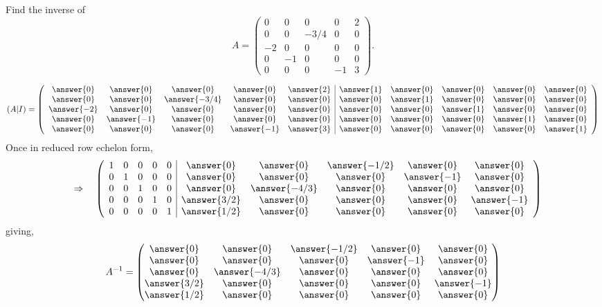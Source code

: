 \documentclass{ximera}
\author{Parisa Fatheddin}
\begin{document}
\begin{exercise}
  Find the inverse of
  \[A = \begin{pmatrix}
    0 & 0& 0& 0& 2\\
    0 & 0& -3/4& 0& 0\\
    -2 & 0& 0& 0& 0\\
    0 & -1& 0& 0& 0\\
    0 & 0& 0& -1& 3
  \end{pmatrix}.
  \]
  \begin{prompt}
\[ (A | I)=
\left(\begin{array}{ccccc|ccccc}
\answer{0} & \answer{0} & \answer{0} & \answer{0} & \answer{2} & \answer{1} & \answer{0} & \answer{0} & \answer{0}& \answer{0}\\
\answer{0} & \answer{0} & \answer{-3/4} & \answer{0} & \answer{0} & \answer{0} & \answer{1} & \answer{0} & \answer{0} & \answer{0}\\
\answer{-2} & \answer{0} & \answer{0} & \answer{0} & \answer{0} & \answer{0} & \answer{0} & \answer{1} & \answer{0} & \answer{0}\\
\answer{0} & \answer{-1} & \answer{0} & \answer{0} & \answer{0}& \answer{0} & \answer{0} & \answer{0} & \answer{1} & \answer{0}\\
\answer{0} & \answer{0} & \answer{0} & \answer{-1} & \answer{3}& \answer{0} & \answer{0} & \answer{0} & \answer{0} & \answer{1}
\end{array}\right)
\]
Once in reduced row echelon form, 
\[
\quad\Rightarrow \quad
\left(\begin{array}{ccccc|ccccc}
1 & 0& 0& 0& 0 & \answer{0} & \answer{0} & \answer{-1/2} & \answer{0} & \answer{0}\\
0 & 1& 0& 0& 0 & \answer{0} & \answer{0} & \answer{0} & \answer{-1} & \answer{0}\\
0 & 0& 1& 0& 0 & \answer{0} & \answer{-4/3} & \answer{0} & \answer{0} & \answer{0}\\
0 & 0& 0& 1& 0 & \answer{3/2} & \answer{0} & \answer{0} & \answer{0} & \answer{-1}\\
0 & 0& 0& 0& 1 & \answer{1/2} & \answer{0} & \answer{0} & \answer{0} & \answer{0}
\end{array}\right)
\]
giving,
\[
A^{-1} = \begin{pmatrix}
\answer{0} & \answer{0} & \answer{-1/2} & \answer{0} & \answer{0}\\
 \answer{0} & \answer{0} & \answer{0} & \answer{-1} & \answer{0}\\
 \answer{0} & \answer{-4/3} & \answer{0} & \answer{0} & \answer{0}\\
 \answer{3/2} & \answer{0} & \answer{0} & \answer{0} & \answer{-1}\\
 \answer{1/2} & \answer{0} & \answer{0} & \answer{0} & \answer{0}
\end{pmatrix}
\]
  \end{prompt}
\end{exercise}
\end{document}
